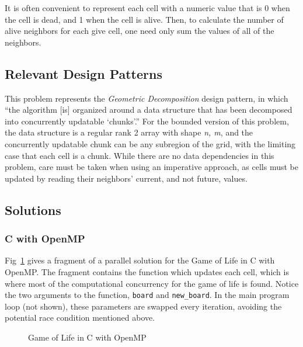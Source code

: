 It is often convenient to represent each cell with a numeric value 
that is 0 when the cell is dead, and 1 when the cell is alive. 
Then, to calculate the number of alive neighbors for each give cell, 
one need only sum the values of all of the neighbors.

\subsection{Relevant Design Patterns}
This problem represents the \textit{Geometric Decomposition} design pattern,\cite{mass}
in which ``the algorithm [is] organized around a data structure that has been decomposed into concurrently updatable `chunks'.''
For the bounded version of this problem, 
the data structure is a regular rank 2 array with shape \textit{n, m}, 
and the concurrently updatable chunk can be any subregion of the grid, 
with the limiting case that each cell is a chunk. 
While there are no data dependencies in this problem, 
care must be taken when using an imperative approach, 
as cells must be updated by reading their neighbors' current, and not future, values.

\subsection{Solutions}
\subsubsection{C with OpenMP}
Fig~\ref{fig::game-of-life-omp.c} gives a fragment of a 
parallel solution for the Game of Life in C with OpenMP.
The fragment contains the function which updates each cell, 
which is where most of the computational concurrency for the game of life is found. 
Notice the two arguments to the function, \texttt{board} and \texttt{new\_board}.
In the main program loop (not shown), these parameters are swapped every iteration, 
avoiding the potential race condition mentioned above.

\begin{figure}[hp]
\begin{quote}
\begin{singlespacing}
\begin{small}
\end{small}
\end{singlespacing}
\end{quote}
\caption{Game of Life in C with OpenMP}
\label{fig::game-of-life-omp.c}
\end{figure}

